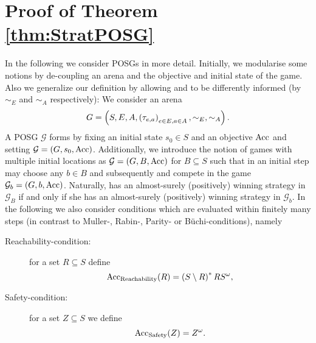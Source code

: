 \chapter{Proof of Theorem \ref{thm:StratPOSG}}
In the following we consider \acp{POSG} in more detail. Initially, we 
modularise some notions by de-coupling an arena and the objective and initial 
state of the game. Also we generalize our definition by allowing \eve{} and 
\adam{} to be differently informed (by $\sim_{E}$ and $\sim_{A}$ respectively):
We consider an arena
\begin{equation*}
  G = \left(S, E, A, \left(\tau_{e,a}\right)_{e\in E, a\in A}, \sim_{E}, \sim_{A}\right).
\end{equation*}
A \ac{POSG} $\mathcal{G}$ forms by fixing an initial state $s_{0}\in S$ and an 
objective $\operatorname{Acc}$ and setting $\mathcal{G} = \left(G, s_{0}, \operatorname{Acc}\right)$.  
Additionally, we introduce the notion of games with multiple initial locations 
as $\mathcal{G} = \left(G, B, \operatorname{Acc}\right)$ for $B\subseteq S$ such that in an 
initial step \adam{} may choose any $b\in B$ and subsequently \eve{} and 
\adam{} compete in the game $\mathcal{G}_{b} = \left(G, b, \operatorname{Acc}\right)$. Naturally, 
\eve{} has an almost-surely (positively) winning strategy in $\mathcal{G}_{B}$ 
if and only if she has an almost-surely (positively) winning strategy in 
$\mathcal{G}_{b}$. In the following we also consider conditions which are 
evaluated within finitely many steps (in contrast to Muller-, Rabin-, Parity-
or Büchi-conditions), namely
\begin{description}
  \item [Reachability-condition:] for a set $R\subseteq S$ define
    \begin{equation*}
      \operatorname{Acc}_{\operatorname{Reachability}}(R) = \left(S\setminus R\right)^{*}RS^{\omega},
    \end{equation*}
  \item [Safety-condition:] for a set $Z\subseteq S$ we define
    \begin{equation*}
      \operatorname{Acc}_{\operatorname{Safety}}(Z) = Z^{\omega}.
    \end{equation*}
\end{description}

